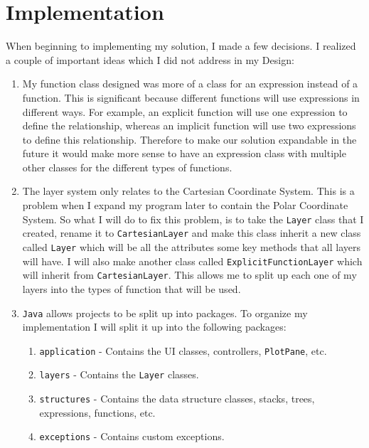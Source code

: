 \documentclass[../../../main.tex]{subfiles}
\begin{document}
\chapter{Implementation}
When beginning to implementing my solution, I made a few decisions. I realized a couple of important ideas which I did not address in my Design:
\begin{enumerate}
\item My function class designed was more of a class for an expression instead of a function. This is significant because different functions will use expressions in different ways. For example, an explicit function will use one expression to define the relationship, whereas an implicit function will use two expressions to define this relationship. Therefore to make our solution expandable in the future it would make more sense to have an expression class with multiple other classes for the different types of functions.
\item The layer system only relates to the Cartesian Coordinate System. This is a problem when I expand my program later to contain the Polar Coordinate System. So what I will do to fix this problem, is to take the \texttt{Layer} class that I created, rename it to \texttt{CartesianLayer} and make this class inherit a new class called \texttt{Layer} which will be all the attributes some key methods that all layers will have. I will also make another class called \texttt{ExplicitFunctionLayer} which will inherit from \texttt{CartesianLayer}. This allows me to split up each one of my layers into the types of function that will be used.
\item \texttt{Java} allows projects to be split up into packages. To organize my implementation I will split it up into the following packages:
	\begin{enumerate}
	\item \texttt{application} - Contains the UI classes, controllers, \texttt{PlotPane}, etc.
	\item \texttt{layers} - Contains the \texttt{Layer} classes.
	\item \texttt{structures} - Contains the data structure classes, stacks, trees, expressions, functions, etc.
	\item \texttt{exceptions} - Contains custom exceptions.
	\end{enumerate}
\end{enumerate}
\newpage
\end{document}
